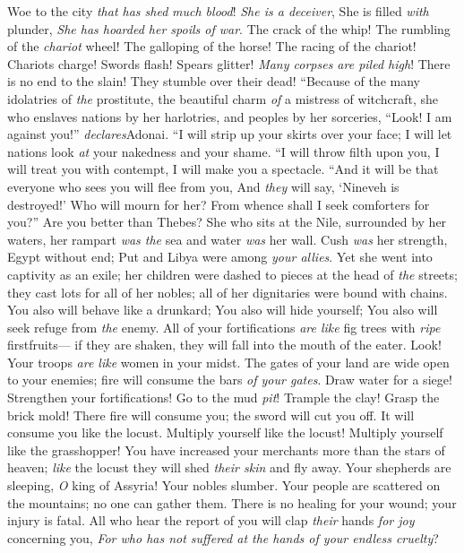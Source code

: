 \begin{biblechapter} %
 Woe to the city \textit{that has shed} \textit{much blood}! 
\textit{She is a deceiver}, 
She is filled \textit{with} plunder, 
\textit{She has hoarded her spoils of war}.
\verse The crack of the whip! 
The rumbling of the \textit{chariot} wheel! 
The galloping of the horse! 
The racing of the chariot!
\verse Chariots charge! 
Swords flash! 
Spears glitter! 
\textit{Many corpses are piled high}! 
There is no end to the slain! 
They stumble over their dead!
 “Because of the many idolatries of \textit{the} prostitute, 
the beautiful charm \textit{of} a mistress of witchcraft, 
she who enslaves nations by her harlotries, 
and peoples by her sorceries,
\verse “Look! I am against you!” \textit{declares}Adonai. 
“I will strip up your skirts over your face; 
I will let nations look \textit{at} your nakedness and your shame.
\verse “I will throw filth upon you, 
I will treat you with contempt, 
I will make you a spectacle.
\verse “And it will be that everyone who sees you will flee from you, 
And \textit{they} will say, ‘Nineveh is destroyed!’ 
Who will mourn for her? 
From whence shall I seek comforters for you?”
 Are you better than Thebes? 
She who sits at the Nile, surrounded by her waters, 
her rampart \textit{was the} sea and water \textit{was} her wall.
\verse Cush \textit{was} her strength, Egypt without end; 
Put and Libya were among \textit{your allies}.
\verse Yet she went into captivity as an exile; 
her children were dashed to pieces at the head of \textit{the} streets; 
they cast lots for all of her nobles; 
all of her dignitaries were bound with chains.
\verse You also will behave like a drunkard; 
You also will hide yourself; 
You also will seek refuge from \textit{the} enemy.
 All of your fortifications \textit{are like} fig trees with \textit{ripe} firstfruits— 
if they are shaken, they will fall into the mouth of the eater.
\verse Look! Your troops \textit{are like} women in your midst. 
The gates of your land are wide open to your enemies; 
fire will consume the bars \textit{of your gates}.
\verse Draw water for a siege! 
Strengthen your fortifications! 
Go to the mud \textit{pit}! 
Trample the clay! 
Grasp the brick mold!
\verse There fire will consume you; 
the sword will cut you off. 
It will consume you like the locust.
 Multiply yourself like the locust! 
Multiply yourself like the grasshopper!
\verse You have increased your merchants more than the stars of heaven; 
\textit{like} the locust they will shed \textit{their skin} and fly away.
 Your shepherds are sleeping, \textit{O} king of Assyria! 
Your nobles slumber. 
Your people are scattered on the mountains; 
no one can gather them.
\verse There is no healing for your wound; 
your injury is fatal. 
All who hear the report of you will clap \textit{their} hands \textit{for joy} concerning you, 
\textit{For who has not suffered at the hands of your endless cruelty}?
\end{biblechapter}

